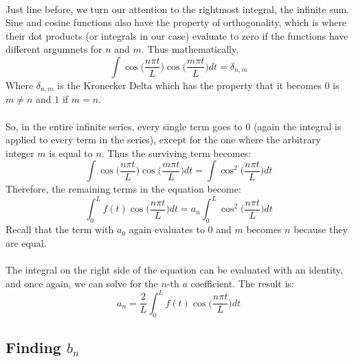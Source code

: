 \documentclass[12pt,letterpaper]{article}
\begin{document}
\paragraph*{}Just line before, we turn our attention to the rightmost integral, the infinite sum. Sine and cosine functions also have the property of orthogonality, which is where their dot products (or integrals in our case) evaluate to zero if the functions have different argumnets for $n$ and $m$. Thus mathematically,
\begin{equation}
\label{othog1}
\int \cos\Big(\frac{n\pi t}{L}\Big)\cos\Big(\frac{m\pi t}{L}\Big) dt = \delta_{n,m}
\end{equation}
Where $\delta_{n,m}$ is the Kronecker Delta which has the property that it becomes $0$ is $m \neq n$ and $1$ if $m = n$.
\paragraph*{}So, in the entire infinite series, every single term goes to $0$ (again the integral is applied to every term in the series), except for the one where the arbitrary integer $m$ is equal to $n$. Thus the surviving term becomes:
\begin{equation}
\int \cos\Big(\frac{n\pi t}{L}\Big)\cos\Big(\frac{m\pi t}{L}\Big) dt =
\int \cos^2\Big(\frac{n\pi t}{L}\Big) dt
\end{equation}
Therefore, the remaining terms in the equation become:
\begin{equation}
\int_0^L f(t)\cos\Big(\frac{n\pi t}{L}\Big) dt = 
a_n \int_0^L \cos^2\Big(\frac{n\pi t}{L}\Big) dt
\end{equation}
Recall that the term with $a_0$ again evaluates to $0$ and $m$ becomes $n$ because they are equal.
\paragraph*{}The integral on the right side of the equation can be evaluated with an identity, and once again, we can solve for the $n$-th $a$ coefficient. The result is:
\begin{equation}
\label{a_n}
a_n = \frac{2}{L}\int_0^L f(t)\cos\Big(\frac{n\pi t}{L}\Big) dt
\end{equation}


\subsection{Finding $b_n$}
\end{document}
